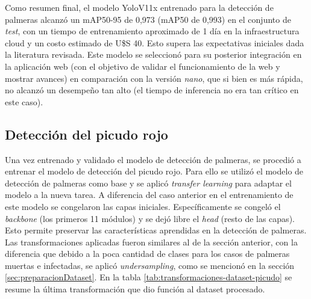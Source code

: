 Como resumen final, el modelo YoloV11x entrenado para la detección de palmeras alcanzó un mAP50-95 de 0,973 (mAP50 de 0,993) en el conjunto de \textit{test}, con un tiempo de entrenamiento aproximado de 1 día en la infraestructura cloud y un costo estimado de U\$S 40. Esto supera las expectativas iniciales dada la literatura revisada. Este modelo se seleccionó para su posterior integración en la aplicación web (con el objetivo de validar el funcionamiento de la web y mostrar avances) en comparación con la versión \textit{nano}, que si bien es más rápida, no alcanzó un desempeño tan alto (el tiempo de inferencia no era tan crítico en este caso).

\subsection{Detección del picudo rojo}
\label{sec:deteccionPicudo}


Una vez entrenado y validado el modelo de detección de palmeras, se procedió a entrenar el modelo de detección del picudo rojo. Para ello se utilizó el modelo de detección de palmeras como base y se aplicó \textit{transfer learning} para adaptar el modelo a la nueva tarea. A diferencia del caso anterior en el entrenamiento de este modelo se congelaron las capas iniciales. Específicamente se congeló el \textit{backbone} (los primeros 11 módulos) y se dejó libre el \textit{head} (resto de las capas). Esto permite preservar las características aprendidas en la detección de palmeras. Las transformaciones aplicadas fueron similares al de la sección anterior, con la diferencia que debido a la poca cantidad de clases para los casos de palmeras muertas e infectadas, se aplicó \textit{undersampling}, como se mencionó en la sección \ref{sec:preparacionDataset}. En la tabla \ref{tab:transformaciones-dataset-picudo} se resume la última transformación que dio función al dataset procesado.

